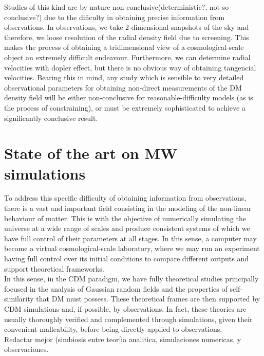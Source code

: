 Studies of this kind are by nature non-conclusive(deterministic?, not so conclusive?) due to the dificulty in obtaining precise information from observations. 
In observations, we take 2-dimensional snapshots of the sky and therefore, we loose resolution of the radial density field due to screening. 
This makes the process of obtaining  a tridimensional view of a cosmological-scale object an extremely difficult endeavour. 
Furthermore, we can determine radial velocities with dopler effect, but there is no obvious way of obtaining tangencial velocities. 
Bearing this in mind, any study which is sensible to very detailed observational parameters for obtaining non-direct measurements of the DM density field will be either non-conclusive for reasonable-difficulty models (as is the process of constraining), or must be extremely sophisticated to achieve a significantly conclusive result.\\

\section{State of the art on MW simulations}
To address this specific difficulty of obtaining information from observations, there is a vast and important field consisting in the modeling of the non-linear behaviour of matter. 
This is with the objective of numerically simulating the universe at a wide range of scales and produce consistent systems of which we have  full control of their parameters at all stages. 
In this sense, a computer may become a virtual cosmological-scale laboratory, where we may run an experiment having full control over its initial conditions to compare different outputs and support theoretical frameworks. \\

In this sense, in the CDM paradigm, we have fully theoretical studies \cite{Bardeen et al. 1986,Schechter} principally focused in the analysis of Gaussian random fields and the properties of self-similarity that DM must possess. 
These theoretical frames are then supported by CDM simulations \cite{Cualquier estudio de CDM hace referencia a esos pilares} and, if possible, by observations. 
In fact, these theories are usually thoroughly verified and complemented through simulations, given their convenient malleability, before being directly applied to observations.\\ Redactar mejor (simbiosis entre teor[ia analitica, simulaciones numericas, y observaciones.

